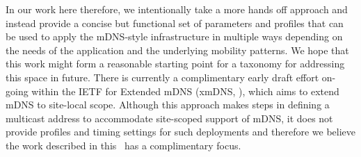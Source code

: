 In our work here therefore, we intentionally take a more hands off approach and instead provide a concise but functional set of parameters and profiles that can be used to apply the mDNS-style infrastructure in multiple ways depending on the needs of the application and the underlying mobility patterns.    We hope that this work might form a reasonable starting point for a taxonomy for addressing this space in future.      There is currently a complimentary early draft effort on-going within the IETF for Extended mDNS (xmDNS,  \cite{lynn2011}), which aims to  extend mDNS to site-local scope. Although this approach makes steps in defining a multicast address to accommodate site-scoped support of mDNS, it does not provide profiles and timing settings for such deployments and therefore we believe the work described in this \doctype~has a complimentary focus.


